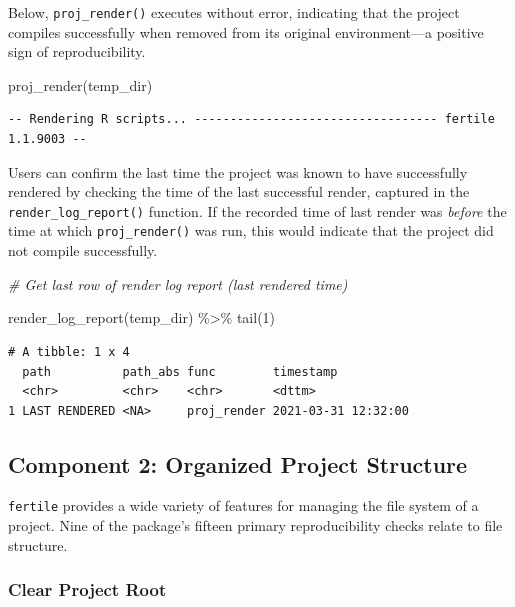 \documentclass[12pt,twoside]{reedthesis}
\newenvironment{Shaded}{\begin{snugshade}}{\end{snugshade}}
\newcommand{\CommentTok}[1]{\textcolor[rgb]{0.56,0.35,0.01}{\textit{#1}}}
\newcommand{\DecValTok}[1]{\textcolor[rgb]{0.00,0.00,0.81}{#1}}
\newcommand{\FunctionTok}[1]{\textcolor[rgb]{0.00,0.00,0.00}{#1}}
\newcommand{\NormalTok}[1]{#1}
\newcommand{\SpecialCharTok}[1]{\textcolor[rgb]{0.00,0.00,0.00}{#1}}
\begin{document}
Below, \texttt{proj\_render()} executes without error, indicating that the project compiles successfully when removed from its original environment---a positive sign of reproducibility.
\begin{Shaded}
\begin{Highlighting}[]
\FunctionTok{proj\_render}\NormalTok{(temp\_dir)}
\end{Highlighting}
\end{Shaded}
\begin{verbatim}
-- Rendering R scripts... ---------------------------------- fertile 1.1.9003 --
\end{verbatim}
Users can confirm the last time the project was known to have successfully rendered by checking the time of the last successful render, captured in the \texttt{render\_log\_report()} function. If the recorded time of last render was \emph{before} the time at which \texttt{proj\_render()} was run, this would indicate that the project did not compile successfully.
\begin{Shaded}
\begin{Highlighting}[]
\CommentTok{\# Get last row of render log report (last rendered time)}

\FunctionTok{render\_log\_report}\NormalTok{(temp\_dir) }\SpecialCharTok{\%\textgreater{}\%}
  \FunctionTok{tail}\NormalTok{(}\DecValTok{1}\NormalTok{)}
\end{Highlighting}
\end{Shaded}
\begin{verbatim}
# A tibble: 1 x 4
  path          path_abs func        timestamp          
  <chr>         <chr>    <chr>       <dttm>             
1 LAST RENDERED <NA>     proj_render 2021-03-31 12:32:00
\end{verbatim}
\hypertarget{component-2-organized-project-structure}{%
\subsection{Component 2: Organized Project Structure}\label{component-2-organized-project-structure}}

\texttt{fertile} provides a wide variety of features for managing the file system of a project. Nine of the package's fifteen primary reproducibility checks relate to file structure.

\hypertarget{clear-project-root}{%
\subsubsection{Clear Project Root}\label{clear-project-root}}
\end{document}
